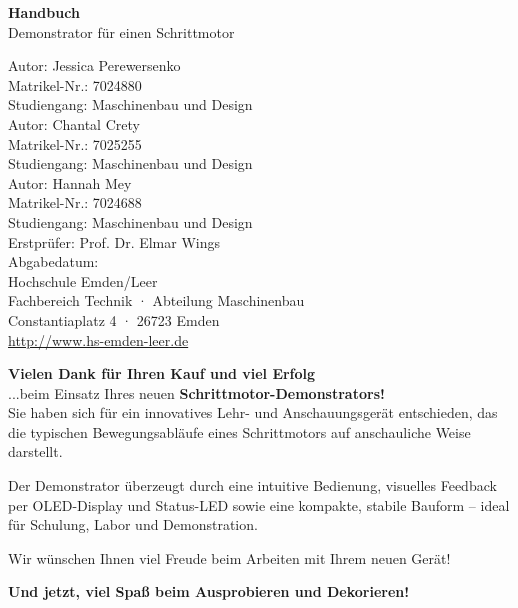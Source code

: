 \documentclass[a4paper,12pt]{report}
\begin{document}
	
	\begin{titlepage}
		\centering
		\vspace*{2cm}
		{\Huge \textbf{Handbuch}}\\[1.5cm]
		{\LARGE Demonstrator für einen Schrittmotor}\\[4cm]
		\begin{flushleft}
			\large
			Autor: Jessica Perewersenko\\
			Matrikel-Nr.: 7024880\\
			Studiengang: Maschinenbau und Design\\[1cm]
			
			Autor: Chantal Crety\\
			Matrikel-Nr.: 7025255\\
			Studiengang: Maschinenbau und Design\\[1cm]
			
			Autor: Hannah Mey\\
			Matrikel-Nr.: 7024688\\
			Studiengang: Maschinenbau und Design\\[1.5cm]
			
			
			Erstprüfer: Prof. Dr. Elmar Wings\\
			Abgabedatum: \\[1.5cm]
			
			Hochschule Emden/Leer\\
			Fachbereich Technik · Abteilung Maschinenbau\\
			Constantiaplatz 4 · 26723 Emden\\
			\url{http://www.hs-emden-leer.de}
		\end{flushleft}
	\end{titlepage}
	
	\vspace*{\fill} %
	\begin{center}
		\begin{tcolorbox}[colback=white!95!gray,
			colframe=black,
			width=0.9\textwidth,
			boxrule=0.5mm,
			arc=2mm,
			auto outer arc,
			drop shadow]
            \textbf{Vielen Dank für Ihren Kauf und viel Erfolg} \\
           ...beim Einsatz             Ihres neuen \textbf{Schrittmotor-Demonstrators!}\\

           Sie haben sich für ein innovatives Lehr- und Anschauungsgerät entschieden, das die typischen Bewegungsabläufe eines Schrittmotors auf anschauliche Weise darstellt.  

           Der Demonstrator überzeugt durch eine intuitive Bedienung, visuelles Feedback per OLED-Display und Status-LED sowie eine kompakte, stabile Bauform – ideal für Schulung, Labor und Demonstration.

           Wir wünschen Ihnen viel Freude beim Arbeiten mit Ihrem neuen Gerät!
			
			\medskip
			\centering
			\textbf{Und jetzt, viel Spaß beim Ausprobieren und Dekorieren!}
		\end{tcolorbox}
	\end{center}
	\vspace*{\fill} %
	
\end{document}
